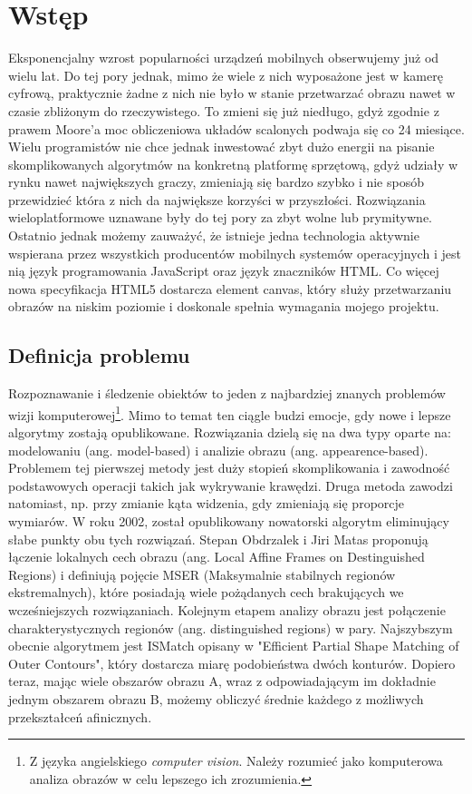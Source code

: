\chapter{Wstęp}

Eksponencjalny wzrost popularności urządzeń mobilnych obserwujemy już od wielu
lat.  Do tej pory jednak, mimo że wiele z nich wyposażone jest w kamerę
cyfrową, praktycznie żadne z nich nie było w stanie przetwarzać obrazu nawet w
czasie zbliżonym do rzeczywistego. To zmieni się już niedługo, gdyż zgodnie z
prawem Moore'a moc obliczeniowa układów scalonych podwaja się co 24 miesiące.
Wielu programistów nie chce jednak inwestować zbyt dużo energii na pisanie
skomplikowanych algorytmów na konkretną platformę sprzętową, gdyż udziały w
rynku nawet największych graczy, zmieniają się bardzo szybko i nie sposób
przewidzieć która z nich da największe korzyści w przyszłości. Rozwiązania
wieloplatformowe uznawane były do tej pory za zbyt wolne lub prymitywne.
Ostatnio jednak możemy zauważyć, że istnieje jedna technologia aktywnie
wspierana przez wszystkich producentów mobilnych systemów operacyjnych i jest
nią język programowania JavaScript oraz język znaczników HTML. Co więcej nowa
specyfikacja HTML5 dostarcza element canvas, który służy przetwarzaniu obrazów
na niskim poziomie i doskonale spełnia wymagania mojego projektu.

\section{Definicja problemu}

Rozpoznawanie i śledzenie obiektów to jeden z najbardziej znanych problemów
wizji komputerowej\footnote{Z języka angielskiego \textit{computer vision}.
Należy rozumieć jako komputerowa analiza obrazów w celu lepszego ich
zrozumienia.}. Mimo to temat ten ciągle budzi emocje, gdy nowe i lepsze
algorytmy zostają opublikowane. Rozwiązania dzielą się na dwa typy oparte na:
modelowaniu (ang. model-based) i analizie obrazu (ang. appearence-based).
Problemem tej pierwszej metody jest duży stopień skomplikowania i zawodność
podstawowych operacji takich jak wykrywanie krawędzi. Druga metoda zawodzi
natomiast, np.  przy zmianie kąta widzenia, gdy zmieniają się proporcje
wymiarów.  W roku 2002, został opublikowany nowatorski algorytm eliminujący
słabe punkty obu tych rozwiązań. Stepan Obdrzalek i Jiri Matas proponują
łączenie lokalnych cech obrazu (ang. Local Affine Frames on Destinguished
Regions) i definiują pojęcie MSER (Maksymalnie stabilnych regionów
ekstremalnych), które posiadają wiele pożądanych cech brakujących we
wcześniejszych rozwiązaniach.  Kolejnym etapem analizy obrazu jest połączenie
charakterystycznych regionów (ang. distinguished regions) w pary. Najszybszym
obecnie algorytmem jest ISMatch opisany w "Efficient Partial Shape Matching of
Outer Contours", który dostarcza miarę podobieństwa dwóch konturów. Dopiero
teraz, mając wiele obszarów obrazu A, wraz z odpowiadającym im dokładnie jednym
obszarem obrazu B, możemy obliczyć średnie każdego z możliwych przekształceń
afinicznych.

